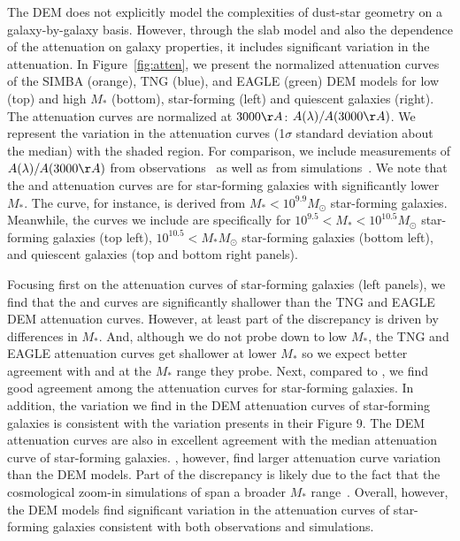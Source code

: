 
The DEM does not explicitly model the complexities of dust-star geometry on a
galaxy-by-galaxy basis. However, through the slab model and also the dependence of
the attenuation on galaxy properties, it includes significant variation in the
attenuation. In Figure~\ref{fig:atten}, we present the normalized attenuation 
curves of the SIMBA (orange), TNG (blue), and EAGLE (green) DEM models for low 
(top) and high $M_*$ (bottom), star-forming (left) and quiescent galaxies (right).
The attenuation curves are normalized at $3000\AA$: $A(\lambda)/A(3000\AA)$.
We represent the variation in the attenuation curves (1$\sigma$ standard
deviation about the median) with the shaded region. For comparison, we include measurements 
of $A(\lambda)/A(3000\AA)$ from observations~\citep{caleztti2000, battisti2017, salim2018} 
as well as from simulations~\cite{narayanan2018}. We note that the \cite{calzetti2000} and
\cite{battisti2017} attenuation curves are for star-forming galaxies with
significantly lower $M_*$. The \cite{battisti2017} curve, for instance, is
derived from $M_* < 10^{9.9}M_\odot$ star-forming galaxies. Meanwhile, the
\cite{salim2018} curves we include are specifically for $10^{9.5} < M_* < 10^{10.5}M_\odot$ 
star-forming galaxies (top left), $10^{10.5} < M_*M_\odot$ star-forming
galaxies (bottom left), and quiescent galaxies (top and bottom right panels). 


Focusing first on the attenuation curves of star-forming galaxies (left
panels), we find that the \cite{calzetti2000} and \cite{battisit2017} curves
are significantly shallower than the TNG and EAGLE DEM attenuation curves.
However, at least part of the discrepancy is driven by differences in $M_*$.
And, although we do not probe down to low $M_*$, the TNG and EAGLE attenuation 
curves get shallower at lower $M_*$ so we expect better agreement with 
\cite{calzetti2000} and \cite{battisit2017} at the $M_*$ range they probe. 
Next, compared to \cite{salim2018}, we find good agreement among the attenuation
curves for star-forming galaxies. In addition, the variation we find in the
DEM attenuation curves of star-forming galaxies is consistent with the
variation \cite{salim2018} presents in their Figure 9. The DEM attenuation
curves are also in excellent agreement with the median attenuation curve of
\cite{narayanan2018} star-forming galaxies. \cite{narayanan2018}, however, find
larger attenuation curve variation than the DEM models. Part of the
discrepancy is likely due to the fact that the cosmological zoom-in simulations
of \cite{narayanan2018} span a broader $M_*$ range~\citep{abruzzo2018}.
Overall, however, the DEM models find significant variation in the attenuation
curves of star-forming galaxies consistent with both observations and
simulations. 

